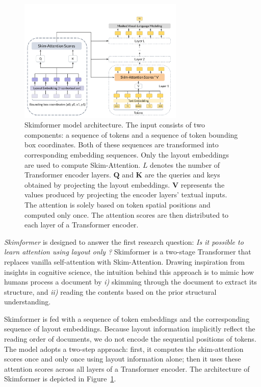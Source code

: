 \begin{figure}
    \centering
    \includegraphics[width=0.7\textwidth]{images/chapter3/skimformer-architecture.pdf}
    \caption{Skimformer model architecture. The input consists of two components: a sequence of tokens and a sequence of token bounding box coordinates. Both of these sequences are transformed into corresponding embedding sequences. Only the layout embeddings are used to compute Skim-Attention. $L$ denotes the number of Transformer encoder layers. $\bm{Q}$ and $\bm{K}$ are the queries and keys obtained by projecting the layout embeddings. $\bm{V}$ represents the values produced by projecting the encoder layers' textual inputs. The attention is solely based on token spatial positions and computed only once. The attention scores are then distributed to each layer of a Transformer encoder.}
    \label{fig:chapter3-skimformer-architecture}
\end{figure}

\emph{Skimformer} is designed to answer the first research question: \textit{Is it possible to learn attention using layout only ?} Skimformer is a two-stage Transformer that replaces vanilla self-attention with Skim-Attention. Drawing inspiration from insights in cognitive science, the intuition behind this approach is to mimic how humans process a document by \emph{i)} skimming through the document to extract its structure, and \emph{ii)}  reading the contents based on the prior structural understanding. 

Skimformer is fed with a sequence of token embeddings and the corresponding sequence of layout embeddings. Because layout information implicitly reflect the reading order of documents, we do not encode the sequential positions of tokens. The model adopts a two-step approach: first, it computes the skim-attention scores once and only once using layout information alone; then it uses these attention scores across all layers of a Transformer encoder. The architecture of Skimformer is depicted in Figure~\ref{fig:chapter3-skimformer-architecture}.

